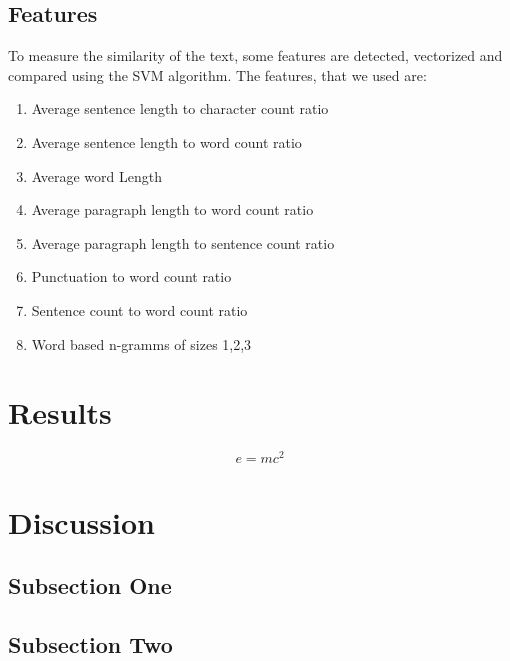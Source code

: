 \documentclass{llncs}
\begin{document}
\subsection {Features}
To measure the similarity of the text, some features are detected, vectorized and compared using the SVM algorithm.
The features, that we used are:
\begin{enumerate}
\item Average sentence length to character count ratio
\item Average sentence length to word count ratio
\item Average word Length
\item Average paragraph length to word count ratio \cite{sanchez}
\item Average paragraph length to sentence count ratio
\item Punctuation to word count ratio
\item Sentence count to word count ratio
\item Word based n-gramms of sizes 1,2,3 
\end{enumerate}



\section{Results}



\begin{equation}
\label{eq:emc}
e = mc^2
\end{equation}



\section{Discussion}

\subsection{Subsection One}


\subsection{Subsection Two}


%
%


\end{document}
